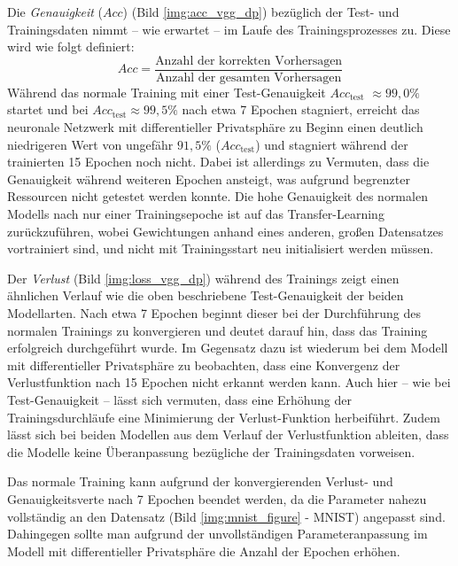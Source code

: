 Die \textit{Genauigkeit} (\(Acc\)) (Bild \ref{img:acc_vgg_dp}) bezüglich der Test- und Trainingsdaten nimmt -- wie erwartet -- im Laufe des Trainingsprozesses zu. 
Diese wird wie folgt definiert: 
\begin{equation}
	Acc = \frac{\text{Anzahl der korrekten Vorhersagen}}{\text{Anzahl der gesamten Vorhersagen}}
\end{equation}
Während das \glqq normale Training\grqq{} mit einer Test-Genauigkeit \(Acc_{\text{test}}\) $\approx99{,}0\%$ startet und bei  \(Acc_{\text{test}}\)$\approx 99{,}5\%$ nach etwa 7 Epochen stagniert, erreicht das \glqq neuronale Netzwerk mit differentieller Privatsphäre\grqq{} zu Beginn einen deutlich niedrigeren Wert von ungefähr $91{,}5\%$ (\(Acc_{\text{test}}\)) und stagniert während der trainierten 15 Epochen noch nicht. Dabei ist allerdings zu Vermuten, dass die Genauigkeit während weiteren Epochen ansteigt, was aufgrund begrenzter Ressourcen nicht getestet werden konnte. Die hohe Genauigkeit des \glqq normalen\grqq{} Modells nach nur einer Trainingsepoche ist auf das Transfer-Learning zurückzuführen, wobei Gewichtungen anhand eines anderen, großen Datensatzes vortrainiert sind, und nicht mit Trainingsstart neu initialisiert werden müssen. 

Der \textit{Verlust} (Bild \ref{img:loss_vgg_dp}) während des Trainings zeigt einen ähnlichen Verlauf wie die oben beschriebene Test-Genauigkeit der beiden Modellarten. Nach etwa 7 Epochen beginnt dieser bei der Durchführung des \glqq normalen Trainings\grqq{} zu konvergieren und deutet darauf hin, dass das Training erfolgreich durchgeführt wurde. Im Gegensatz dazu ist wiederum bei dem \glqq Modell mit differentieller Privatsphäre\grqq{} zu beobachten, dass eine Konvergenz der Verlustfunktion nach 15 Epochen nicht erkannt werden kann. Auch hier -- wie bei Test-Genauigkeit -- lässt sich vermuten, dass eine Erhöhung der Trainingsdurchläufe eine Minimierung der Verlust-Funktion herbeiführt.  Zudem lässt sich bei beiden Modellen aus dem Verlauf der Verlustfunktion ableiten, dass die Modelle keine Überanpassung bezügliche der Trainingsdaten vorweisen. 

Das \glqq normale Training\grqq{} kann aufgrund der konvergierenden Verlust- und Genauigkeitsverte nach 7 Epochen beendet werden, da die Parameter nahezu vollständig an den Datensatz (Bild \ref{img:mnist_figure} - MNIST) angepasst sind. Dahingegen sollte man aufgrund der unvollständigen Parameteranpassung im Modell mit differentieller Privatsphäre die Anzahl der Epochen  erhöhen.

